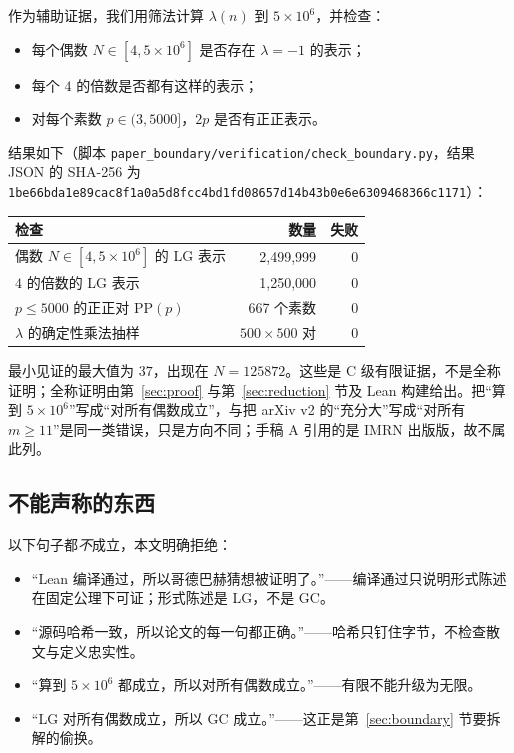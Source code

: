 \documentclass[11pt,a4paper]{ctexart}
\theoremstyle{plain}
\theoremstyle{definition}
\newcommand{\li}{\lambda}
\newcommand{\PP}{\mathrm{PP}}
\newcommand{\code}[1]{\texttt{#1}}
\begin{document}
作为辅助证据，我们用筛法计算 $\li(n)$ 到 $5\times10^6$，并检查：
\begin{itemize}
\item 每个偶数 $N\in[4,5\times10^6]$ 是否存在 $\li=-1$ 的表示；
\item 每个 $4$ 的倍数是否都有这样的表示；
\item 对每个素数 $p\in(3,5000]$，$2p$ 是否有正正表示。
\end{itemize}
结果如下（脚本 \code{paper\_boundary/verification/check\_boundary.py}，结果 JSON 的 SHA-256 为 \code{1be66bda1e89cac8f1a0a5d8fcc4bd1fd08657d14b43b0e6e6309468366c1171}）：
\begin{center}
\small
\begin{tabular}{@{}lrr@{}}
\toprule
检查 & 数量 & 失败 \\
\midrule
偶数 $N\in[4,5\times10^6]$ 的 LG 表示 & 2,499,999 & 0 \\
$4$ 的倍数的 LG 表示 & 1,250,000 & 0 \\
$p\le5000$ 的正正对 $\PP(p)$ & 667 个素数 & 0 \\
$\li$ 的确定性乘法抽样 & $500\times500$ 对 & 0 \\
\bottomrule
\end{tabular}
\end{center}
最小见证的最大值为 $37$，出现在 $N=125872$。这些是 C 级有限证据，不是全称证明；全称证明由第~\ref{sec:proof} 与第~\ref{sec:reduction} 节及 Lean 构建给出。把“算到 $5\times10^6$”写成“对所有偶数成立”，与把 arXiv v2 的“充分大”写成“对所有 $m\ge11$”是同一类错误，只是方向不同；手稿 A 引用的是 IMRN 出版版，故不属此列。

\subsection{不能声称的东西}
\label{sec:not-claimed}

以下句子都\emph{不}成立，本文明确拒绝：
\begin{itemize}
\item “Lean 编译通过，所以哥德巴赫猜想被证明了。”——编译通过只说明形式陈述在固定公理下可证；形式陈述是 LG，不是 GC。
\item “源码哈希一致，所以论文的每一句都正确。”——哈希只钉住字节，不检查散文与定义忠实性。
\item “算到 $5\times10^6$ 都成立，所以对所有偶数成立。”——有限不能升级为无限。
\item “LG 对所有偶数成立，所以 GC 成立。”——这正是第~\ref{sec:boundary} 节要拆解的偷换。
\end{itemize}
\end{document}
